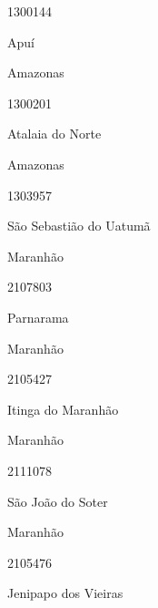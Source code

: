 \documentclass[
  letterpaper,
]{report}
\begin{document}
\n      

1300144

\n      

Apuí

\n    

\n    

\n      

Amazonas

\n      

1300201

\n      

Atalaia do Norte

\n    

\n    

\n      

Amazonas

\n      

1303957

\n      

São Sebastião do Uatumã

\n    

\n    

\n      

Maranhão

\n      

2107803

\n      

Parnarama

\n    

\n    

\n      

Maranhão

\n      

2105427

\n      

Itinga do Maranhão

\n    

\n    

\n      

Maranhão

\n      

2111078

\n      

São João do Soter

\n    

\n    

\n      

Maranhão

\n      

2105476

\n      

Jenipapo dos Vieiras
\end{document}
